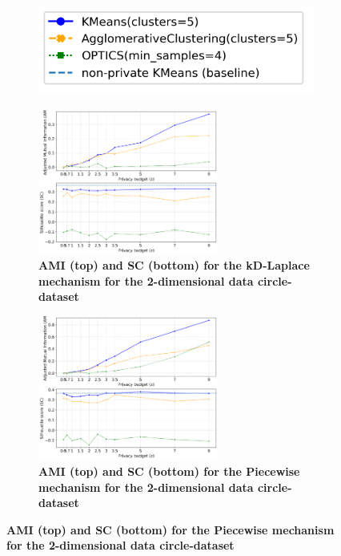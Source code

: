 \begin{figure}[H]
    \centering
    \begin{subfigure}{0.3\textwidth}
        \includegraphics[width=\textwidth]{Results/kd-laplace/kd-Laplace/circle-dataset/legend_2.png}
    \end{subfigure}
    \begin{subfigure}{1\textwidth}
        \centering
        \caption{\textbf{AMI (top) and SC (bottom) for the kD-Laplace mechanism for the 2-dimensional data circle-dataset}}
        \includegraphics[width=0.65\textwidth]{Results/kd-laplace/kd-Laplace/circle-dataset/ami-and-sc_2_dimensions.png}
        \centering
    \end{subfigure}
    \begin{subfigure}{1\textwidth}
        \centering
        \caption{\textbf{AMI (top) and SC (bottom) for the Piecewise mechanism for the 2-dimensional data circle-dataset}}
        \includegraphics[width=0.65\textwidth]{Results/kd-laplace/piecewise/circle-dataset/ami-and-sc_2_dimensions.png}
    \end{subfigure}
    \label{fig:validation-circle-dataset_comparison_2d-laplace}
\end{figure}
